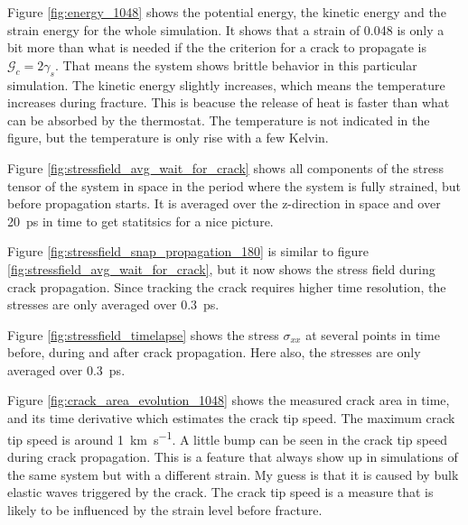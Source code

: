 Figure \ref{fig:energy_1048} shows the potential energy, the kinetic energy and the strain energy for the whole simulation. It shows that a strain of 0.048 is only a bit more than what is needed if the the criterion for a crack to propagate is $\mathcal{G}_c = 2\gamma_s$. That means the system shows brittle behavior in this particular simulation. The kinetic energy slightly increases, which means the temperature increases during fracture. This is beacuse the release of heat is faster than what can be absorbed by the thermostat. The temperature is not indicated in the figure, but the temperature is only rise with a few Kelvin. 

Figure \ref{fig:stressfield_avg_wait_for_crack} shows all components of the stress tensor of the system in space in the period where the system is fully strained, but before propagation starts. It is averaged over the z-direction in space and over \SI{20}{\pico\second} in time to get statitsics for a nice picture. 


Figure \ref{fig:stressfield_snap_propagation_180} is similar to figure \ref{fig:stressfield_avg_wait_for_crack}, but it now shows the stress field during crack propagation. Since tracking the crack requires higher time resolution, the stresses are only averaged over \SI{0.3}{\pico\second}. 

Figure \ref{fig:stressfield_timelapse} shows the stress $\sigma_{xx}$ at several points in time before, during and after crack propagation. Here also, the stresses are only averaged over \SI{0.3}{\pico\second}.

Figure \ref{fig:crack_area_evolution_1048} shows the measured crack area in time, and its time derivative which estimates the crack tip speed. The maximum crack tip speed is around \SI{1}{\kilo\meter\per\second}. A little bump can be seen in the crack tip speed during crack propagation. This is a feature that always show up in simulations of the same system but with a different strain. My guess is that it is caused by bulk elastic waves triggered by the crack. The crack tip speed is a measure that is likely to be influenced by the strain level before fracture. 

